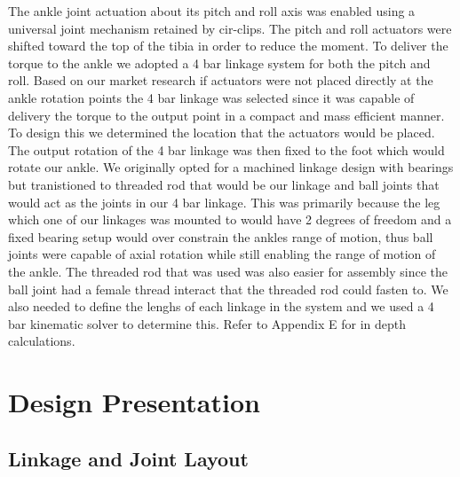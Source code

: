 \documentclass{article}
\begin{document}
The ankle joint actuation about its pitch and roll axis was enabled using a universal joint mechanism retained by cir-clips. The pitch and roll actuators were shifted toward the top of the tibia in order to reduce the moment. To deliver the torque to the ankle we adopted a 4 bar linkage system for both the pitch and roll. Based on our market research if actuators were not placed directly at the ankle rotation points the 4 bar linkage was selected since it was capable of delivery the torque to the output point in a compact and mass efficient manner. To design this we determined the location that the actuators would be placed. The output rotation of the 4 bar linkage was then fixed to the foot which would rotate our ankle. We originally opted for a machined linkage design with bearings but tranistioned to threaded rod that would be our linkage and ball joints that would act as the joints in our 4 bar linkage. This was primarily because the leg which one of our linkages was mounted to would have 2 degrees of freedom and a fixed bearing setup would over constrain the ankles range of motion, thus ball joints were capable of axial rotation while still enabling the range of motion of the ankle. The threaded rod that was used was also easier for assembly since the ball joint had a female thread interact that the threaded rod could fasten to. We also needed to define the lenghs of each linkage in the system and we used a 4 bar kinematic solver to determine this. Refer to Appendix E for in depth calculations. 





\newpage
\section{Design Presentation}

\subsection{Linkage and Joint Layout}
\end{document}
